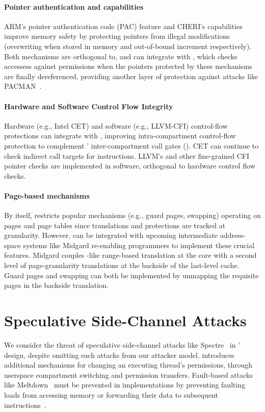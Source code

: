\paragraph{Pointer authentication and capabilities}
ARM's pointer authentication code (PAC) feature and CHERI's capabilities
improve memory safety by protecting pointers from illegal 
modifications (overwriting when stored in memory and out-of-bound
increment respectively). Both mechanisms are orthogonal to,
and can integrate with \seccells, which checks accessess against \ptable
permissions when the 
pointers protected by these mechanisms are finally dereferenced, providing
another layer of protection against attacks like PACMAN~\cite{pacmanRavichandranNLY22}.

\paragraph{Hardware and Software Control Flow Integrity}
Hardware (e.g., Intel CET) and software (e.g., LLVM-CFI) control-flow
protections can integrate with \seccells, 
improving intra-compartment control-flow protection to
complement \seccells' inter-compartment call gates (\sdentry).
CET can continue to check indirect call targets for  instructions. 
LLVM's and other fine-grained CFI pointer checks are implemented in software, 
orthogonal to hardware control flow checks.


\paragraph{Page-based mechanisms}
By itself, \seccells restricts popular mechanisms (e.g., guard pages, swapping)
operating on pages and page tables since translations and protections are 
tracked at \cell granularity.
However, \seccells can be integrated with upcoming intermediate address-space 
systems like Midgard re-enabling programmers to implement these crucial 
features.
Midgard couples \seccells-like range-based translation at the core with
a second level of page-granularity translations at the backside of the 
last-level cache.
Guard pages and swapping can both be implemented by unmapping the requisite pages 
in the backside translation.


\section{Speculative Side-Channel Attacks}
\label{app:sidechannel}

We consider the threat of speculative side-channel attacks like 
Spectre~\cite{KocherHFGGHHLM019}
in \seccells' design, despite omitting such attacks from our attacker model.
\seccells{} introduces additional mechanisms for changing an executing
thread's permissions, through userspace compartment switching and
permission transfers.
Fault-based attacks like Meltdown~\cite{lipp18sec} must be prevented in
implementations by preventing faulting loads from accessing memory or
forwarding their data to subsequent instructions~\cite{WeisseNLWK19}.

